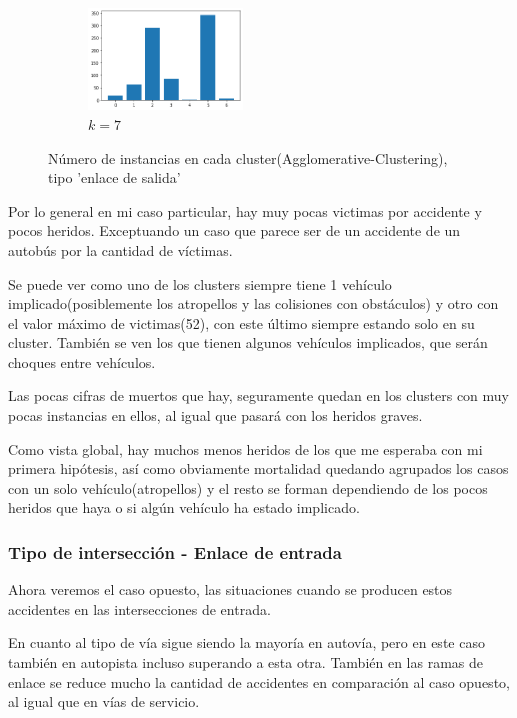 \begin{figure}[H]
\begin{subfigure}{.5\textwidth}
\end{subfigure}
\begin{subfigure}{.5\textwidth}
  \centering
  \includegraphics[width=0.45\textwidth]{imagenes/counter/salida/agg7.png}
  \caption{$k=7$}
\end{subfigure}
\caption{Número de instancias en cada cluster(Agglomerative-Clustering), tipo 'enlace de salida'}
\label{fig:hm-km}
\end{figure}

Por lo general en mi caso particular, hay muy pocas victimas por accidente y pocos heridos. Exceptuando un caso que parece ser de un accidente de un autobús por la cantidad de víctimas.

Se puede ver como uno de los clusters siempre tiene 1 vehículo implicado(posiblemente los atropellos y las colisiones con obstáculos) y otro con el valor máximo de victimas(52), con este último siempre estando solo en su cluster. También se ven los que tienen algunos vehículos implicados, que serán choques entre vehículos.

Las pocas cifras de muertos que hay, seguramente quedan en los clusters con muy pocas instancias en ellos, al igual que pasará con los heridos graves.

Como vista global, hay muchos menos heridos de los que me esperaba con mi primera hipótesis, así como obviamente mortalidad quedando agrupados los casos con un solo vehículo(atropellos) y el resto se forman dependiendo de los pocos heridos que haya o si algún vehículo ha estado implicado.

\subsubsection{Tipo de intersección - Enlace de entrada}

Ahora veremos el caso opuesto, las situaciones cuando se producen estos accidentes en las intersecciones de entrada.

En cuanto al tipo de vía sigue siendo la mayoría en autovía, pero en este caso también en autopista incluso superando a esta otra. También en las ramas de enlace se reduce mucho la cantidad de accidentes en comparación al caso opuesto, al igual que en vías de servicio.

